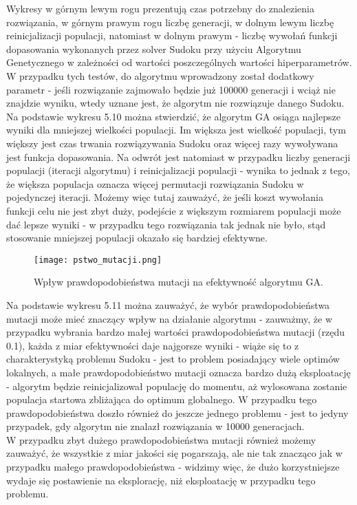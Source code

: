 \documentclass[11pt]{scrartcl} %
\begin{document}
Wykresy w górnym lewym rogu prezentują czas potrzebny do znalezienia rozwiązania, w górnym prawym rogu liczbę generacji, w dolnym lewym liczbę reinicjalizacji populacji, natomiast w dolnym prawym - liczbę wywołań funkcji dopasowania wykonanych przez solver Sudoku przy użyciu Algorytmu Genetycznego w zależności od wartości poszczególnych wartości hiperparametrów.\\

W przypadku tych testów, do algorytmu wprowadzony został dodatkowy parametr - jeśli rozwiązanie zajmowało będzie już 100000 generacji i wciąż nie znajdzie wyniku, wtedy uznane jest, że algorytm nie rozwiązuje danego Sudoku.\\


Na podstawie wykresu 5.10 można stwierdzić, że algorytm GA osiąga najlepsze wyniki dla mniejszej wielkości populacji. Im większa jest wielkość populacji, tym większy jest czas trwania rozwiązywania Sudoku oraz więcej razy wywoływana jest funkcja dopasowania. Na odwrót jest natomiast w przypadku liczby generacji populacji (iteracji algorytmu) i reinicjalizacji populacji - wynika to jednak z tego, że większa populacja oznacza więcej permutacji rozwiązania Sudoku w pojedynczej iteracji. Możemy więc tutaj zauważyć, że jeśli koszt wywołania funkcji celu nie jest zbyt duży, podejście z większym rozmiarem populacji może dać lepsze wyniki - w przypadku tego rozwiązania tak jednak nie było, stąd stosowanie mniejszej populacji okazało się bardziej efektywne.\\
\begin{figure}[h] %
        \centering
        \texttt{[image: pstwo\_mutacji.png]} %
        \caption{Wpływ prawdopodobieństwa mutacji na efektywność algorytmu GA.}
\end{figure}

Na podstawie wykresu 5.11 można zauważyć, że wybór prawdopodobieństwa mutacji może mieć znaczący wpływ na działanie algorytmu - zauważmy, że w przypadku wybrania bardzo małej wartości prawdopodobieństwa mutacji (rzędu 0.1), każda z miar efektywności daje najgorsze wyniki - wiąże się to z charakterystyką problemu Sudoku - jest to problem posiadający wiele optimów lokalnych, a małe prawdopodobieństwo mutacji oznacza bardzo dużą eksploatację - algorytm będzie reinicjalizował populację do momentu, aż wylosowana zostanie populacja startowa zbliżająca do optimum globalnego. W przypadku tego prawdopodobieństwa doszło również do jeszcze jednego problemu - jest to jedyny przypadek, gdy algorytm nie znalazł rozwiązania w 10000 generacjach. \\
W przypadku zbyt dużego prawdopodobieństwa mutacji również możemy zauważyć, że wszystkie z miar jakości się pogarszają, ale nie tak znacząco jak w przypadku małego prawdopodobieństwa - widzimy więc, że dużo korzystniejsze wydaje się postawienie na eksplorację, niż eksploatację w przypadku tego problemu.\\
\end{document}

